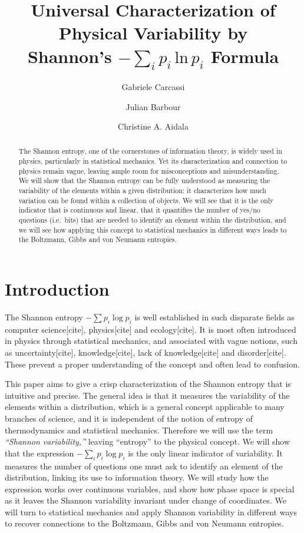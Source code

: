 \documentclass[prb, twocolumn]{revtex4-1}
\begin{document}
\title{Universal Characterization of Physical Variability by \\Shannon's $-\sum_ip_i\,\textrm{ln}\,p_i$ Formula}

\author{Gabriele Carcassi}
\author{Julian Barbour}
\author{Christine A. Aidala}

\begin{abstract}
	The Shannon entropy, one of the cornerstones of information theory, is widely used in physics, particularly in statistical mechanics. Yet its characterization and connection to physics remain vague, leaving ample room for misconceptions and misunderstanding. We will show that the Shannon entropy can be fully understood as measuring the variability of the elements within a given distribution: it characterizes how much variation can be found within a collection of objects. We will see that it is the only indicator that is continuous and linear, that it quantifies the number of yes/no questions (i.e.~bits) that are needed to identify an element within the distribution, and we will see how applying this concept to statistical mechanics in different ways leads to the Boltzmann, Gibbs and von Neumann entropies.
\end{abstract}

\maketitle


\section{Introduction\label{int}}

The Shannon entropy $-\sum p_i \log p_i$ is well established in such disparate fields as computer science[cite], physics[cite] and ecology[cite]. It is most often introduced in physics through statistical mechanics, and associated with vague notions, such as uncertainty[cite], knowledge[cite], lack of knowledge[cite] and disorder[cite]. These prevent a proper understanding of the concept and often lead to confusion.

This paper aims to give a crisp characterization of the Shannon entropy that is intuitive and precise. The general idea is that it measures the variability of the elements within a distribution, which is a general concept applicable to many branches of science, and it is independent of the notion of entropy of thermodynamics and statistical mechanics. Therefore we will use the term \emph{``Shannon variability,''} leaving ``entropy'' to the physical concept. We will show that the expression $- \sum_i p_i \log p_i$ is the only linear indicator of variability. It measures the number of questions one must ask to identify an element of the distribution, linking its use to information theory. We will study how the expression works over continuous variables, and show how phase space is special as it leaves the Shannon variability invariant under change of coordinates. We will turn to statistical mechanics and apply Shannon variability in different ways to recover connections to the Boltzmann, Gibbs and von Neumann entropies.
\end{document}
